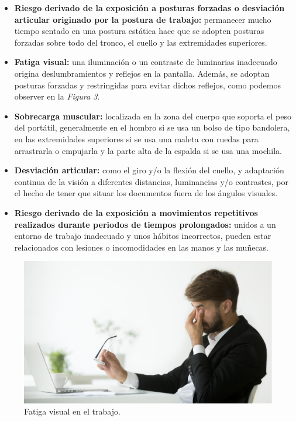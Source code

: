 \documentclass{article}
\begin{document}
      \begin{itemize}
        \item \textbf{Riesgo derivado de la exposición a posturas forzadas o desviación articular originado por la postura de trabajo:} permanecer mucho tiempo sentado en una 
        postura estática hace que se adopten posturas forzadas sobre todo del tronco, el cuello y las extremidades superiores.
        \item \textbf{Fatiga visual:} una iluminación o un contraste de luminarias inadecuado origina deslumbramientos y reflejos en la pantalla. Además, se adoptan posturas 
        forzadas y restringidas para evitar dichos reflejos, como podemos observer en la \textit{Figura 3}.
        \item \textbf{Sobrecarga muscular:} localizada en la zona del cuerpo que soporta el peso del portátil, generalmente en el hombro si se usa un bolso de tipo bandolera, 
        en las extremidades superiores si se usa una maleta con ruedas para arrastrarla o empujarla y la parte alta de la espalda si se usa una mochila.
        \item \textbf{Desviación articular:} como el giro y/o la flexión del cuello, y adaptación continua de la visión a diferentes distancias, luminancias y/o contrastes, 
        por el hecho de tener que situar los documentos fuera de los ángulos visuales.
        \item \textbf{Riesgo derivado de la exposición a movimientos repetitivos realizados durante periodos de tiempos prolongados:} unidos a un entorno de trabajo inadecuado 
        y unos hábitos incorrectos, pueden estar relacionados con lesiones o incomodidades en las manos y las muñecas.
      \end{itemize}
      
      \begin{figure}[h]
        \centering
        \includegraphics[scale = 0.75]{img/visual.jpg}
        \caption{Fatiga visual en el trabajo.}
      \end{figure}
\end{document}
